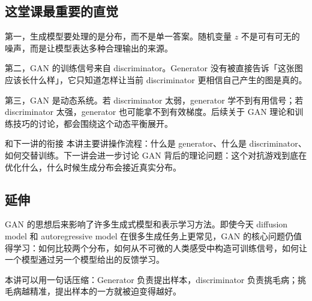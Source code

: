 \documentclass[a4paper]{article}
\begin{document}
\subsection{这堂课最重要的直觉}

第一，生成模型要处理的是分布，而不是单一答案。随机变量 $z$ 不是可有可无的噪声，而是让模型表达多种合理输出的来源。

第二，GAN 的训练信号来自 discriminator。Generator 没有被直接告诉「这张图应该长什么样」，它只知道怎样让当前 discriminator 更相信自己产生的图是真的。

第三，GAN 是动态系统。若 discriminator 太弱，generator 学不到有用信号；若 discriminator 太强，generator 也可能拿不到有效梯度。后续关于 GAN 理论和训练技巧的讨论，都会围绕这个动态平衡展开。

\begin{importantbox}{和下一讲的衔接}
    本讲主要讲操作流程：什么是 generator、什么是 discriminator、如何交替训练。下一讲会进一步讨论 GAN 背后的理论问题：这个对抗游戏到底在优化什么，什么时候生成分布会接近真实分布。
\end{importantbox}

\subsection{延伸}

GAN 的思想后来影响了许多生成式模型和表示学习方法。即使今天 diffusion model 和 autoregressive model 在很多生成任务上更常见，GAN 的核心问题仍值得学习：如何比较两个分布，如何从不可微的人类感受中构造可训练信号，如何让一个模型通过另一个模型给出的反馈学习。

本讲可以用一句话压缩：Generator 负责提出样本，discriminator 负责挑毛病；挑毛病越精准，提出样本的一方就被迫变得越好。
\end{document}
